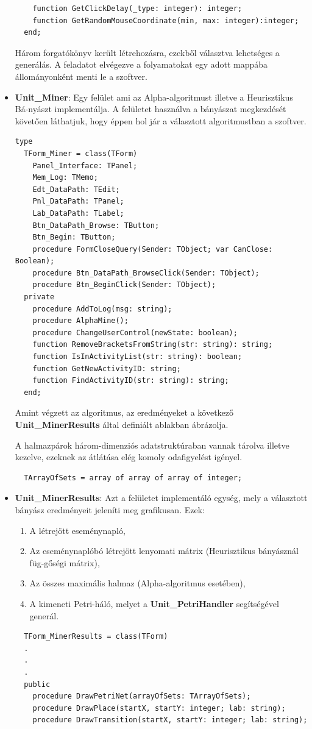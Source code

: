 \begin{itemize}
{\begin{lstlisting}
    function GetClickDelay(_type: integer): integer;
    function GetRandomMouseCoordinate(min, max: integer):integer;
  end;

	\end{lstlisting}

		Három forgatókönyv került létrehozásra, ezekből választva lehetséges a generálás. A feladatot elvégezve a folyamatokat egy adott mappába állományonként menti le a szoftver.
	}
	\item{
		\textbf{Unit\_Miner}: Egy felület ami az Alpha-algoritmust illetve a Heurisztikus Bá\hyp{}nyászt  implementálja. A felületet használva a bányászat megkezdését követően láthatjuk, hogy éppen hol jár a választott algoritmustban a szoftver.
	\begin{lstlisting}
type
  TForm_Miner = class(TForm)
    Panel_Interface: TPanel;
    Mem_Log: TMemo;
    Edt_DataPath: TEdit;
    Pnl_DataPath: TPanel;
    Lab_DataPath: TLabel;
    Btn_DataPath_Browse: TButton;
    Btn_Begin: TButton;
    procedure FormCloseQuery(Sender: TObject; var CanClose: Boolean);
    procedure Btn_DataPath_BrowseClick(Sender: TObject);
    procedure Btn_BeginClick(Sender: TObject);
  private
    procedure AddToLog(msg: string);
    procedure AlphaMine();
    procedure ChangeUserControl(newState: boolean);
    function RemoveBracketsFromString(str: string): string;
    function IsInActivityList(str: string): boolean;
    function GetNewActivityID: string;
    function FindActivityID(str: string): string;
  end;
	\end{lstlisting}

Amint végzett az algoritmus, az eredményeket a következő \textbf{Unit\_MinerResults} által definiált ablakban ábrázolja.

A halmazpárok három-dimenziós adatstruktúraban vannak tárolva illetve kezelve, ezeknek az átlátása elég komoly odafigyelést igényel.
	\begin{lstlisting}
  TArrayOfSets = array of array of array of integer;
	\end{lstlisting}

	}
	\item{
		\textbf{Unit\_MinerResults}: Azt a felületet implementáló egység, mely a választott bányász eredményeit jeleníti meg grafikusan. Ezek:
		\begin{enumerate}
			\item{A létrejött eseménynapló,}
			\item{Az eseménynaplóbó létrejött lenyomati mátrix (Heurisztikus bányásznál füg\hyp{}gőségi mátrix),}
			\item{Az összes maximális halmaz (Alpha-algoritmus esetében),}
			\item{A kimeneti Petri-háló, melyet a \textbf{Unit\_PetriHandler} segítségével generál.}
		\end{enumerate}
		\begin{lstlisting}
  TForm_MinerResults = class(TForm)
  .
  .
  .
  public
    procedure DrawPetriNet(arrayOfSets: TArrayOfSets);
    procedure DrawPlace(startX, startY: integer; lab: string);
    procedure DrawTransition(startX, startY: integer; lab: string);


\end{lstlisting}}
\end{itemize}
